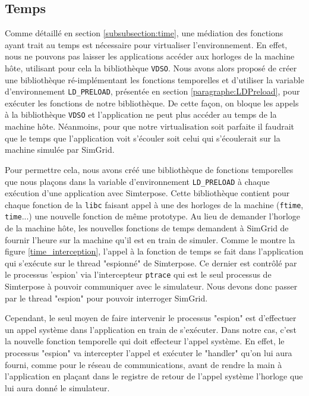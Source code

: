 \subsection{Temps}
\label{section:work:time}

Comme détaillé en section \ref{subsubsection:time}, une médiation des fonctions ayant trait au temps est nécessaire pour virtualiser l'environnement. En effet, nous ne pouvons pas laisser les applications accéder aux horloges de la machine hôte, utilisant pour cela la bibliothèque \texttt{VDSO}. Nous avons alors proposé de créer une bibliothèque ré-implémentant les fonctions temporelles et d'utiliser la variable d'environnement \texttt{LD\_PRELOAD}, présentée en section \ref{paragraphe:LDPreload}, pour exécuter les fonctions de notre bibliothèque. De cette façon, on bloque les appels à la bibliothèque \texttt{VDSO} et l'application ne peut plus accéder au temps de la machine hôte. Néanmoins, pour que notre virtualisation soit parfaite il faudrait que le temps que l'application voit s'écouler soit celui qui s'écoulerait sur la machine simulée par SimGrid. 

Pour permettre cela, nous avons créé une bibliothèque de fonctions temporelles que nous plaçons dans la variable d'environnement \texttt{LD\_PRELOAD} à chaque exécution d'une application avec Simterpose. Cette bibliothèque contient pour chaque fonction de la \texttt{libc} faisant appel à une des horloges de la machine (\texttt{ftime}, \texttt{time}...) une nouvelle fonction de même prototype. Au lieu de demander l'horloge de la machine hôte, les nouvelles fonctions de temps demandent à SimGrid de fournir l'heure sur la machine qu'il est en train de simuler. Comme le montre la figure \ref{time_interception}, l'appel à la fonction de temps se fait dans l'application qui s'exécute sur le thread "espionné" de Simterpose. Ce dernier est contrôlé par le processus 'espion' via l'intercepteur \texttt{ptrace} qui est le seul processus de Simterpose à pouvoir communiquer avec le simulateur. Nous devons donc passer par le thread "espion" pour pouvoir interroger SimGrid. 

Cependant, le seul moyen de faire intervenir le processus "espion" est d'effectuer un appel système dans l'application en train de s'exécuter. Dans notre cas, c'est la nouvelle fonction temporelle qui doit effecteur l'appel système. En effet, le processus "espion" va intercepter l'appel et exécuter le "handler" qu'on lui aura fourni, comme pour le réseau de communications, avant de rendre la main à l'application en plaçant dans le registre de retour de l'appel système l'horloge que lui aura donné le simulateur.

